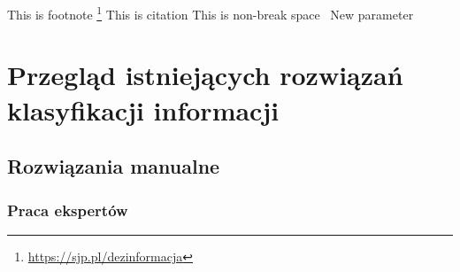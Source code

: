 This is footnote \footnote{\url{https://sjp.pl/dezinformacja}}
This is citation \cite{threeTypeOfFakes2015}
This is non-break space \,
New parameter \par 

\newpage %
\section{Przegląd istniejących rozwiązań klasyfikacji informacji}
\subsection{Rozwiązania manualne}
\subsubsection{Praca ekspertów}